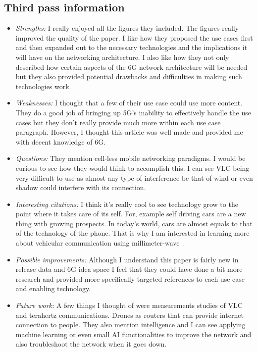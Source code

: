 \documentclass[letterpaper,twocolumn,10pt]{article}
\begin{document}
\subsection{Third pass information}
\label{sec:third}
\begin{itemize}

\item {\it Strengths:} 
I really enjoyed all the figures they included. The figures really improved the quality of the paper. I like how they 
proposed the use cases first and then expanded out to the necessary technologies and the implications it will 
have on the networking architecture. I also like how they not only described how certain aspects of the 6G network
architecture will be needed but they also provided potential drawbacks and difficulties in making such technologies
work.

\item {\it Weaknesses:} 
I thought that a few of their use case could use more content. They do a good job of bringing up 5G's inability
to effectively handle the use cases but they don't really provide much more within each use case paragraph. 
However, I thought this article was well made and provided me with decent knowledge of 6G. 

\item {\it Questions:} 
They mention cell-less mobile networking paradigms. I would be curious to see how they would think to 
accomplish this. I can see VLC being very difficult to use as almost any type of interference be that of 
wind or even shadow could interfere with its connection. 

\item {\it Interesting citations:} 
I think it's really cool to see technology grow to the point where it takes care of its self. For, example self 
driving cars are a new thing with growing prospects. In today's world, cars are almost equals to that of 
the technology of the phone. That is why I am interested in learning more about vehicular communication using
millimeter-wave~\cite{vehicular}.

\item {\it Possible improvements:} 
Although I understand this paper is fairly new in release data and 6G idea space I feel that they could have done 
a bit more research and provided more specifically targeted references to each use case and enabling technology.

\item {\it Future work:} 
A few things I thought of were measurements studies of VLC and terahertz communications. Drones as routers that
can provide internet connection to people. They also mention intelligence and I can see applying machine learning or even small
AI functionalities to improve the network and also troubleshoot the network when it goes down.


\end{itemize}

{
  \small 
  
  
}
\end{document}
